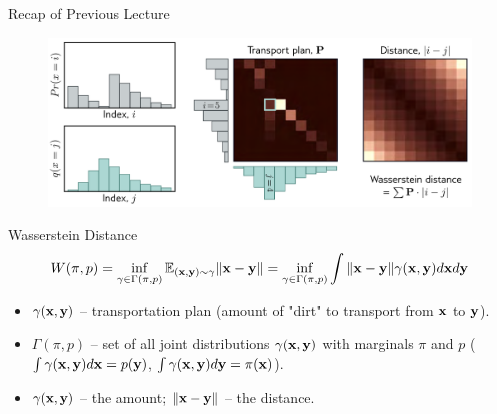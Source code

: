\documentclass{beamer}
\begin{document}
\begin{frame}{Recap of Previous Lecture}
	\begin{figure}
		\centering
		\includegraphics[width=0.8\linewidth]{figs/discrete_wasserstein}
	\end{figure}
	\vspace{-0.3cm}
	\begin{block}{Wasserstein Distance}
		\vspace{-0.7cm}
		\[
		W(\pi, p) = \inf_{\gamma \in \Gamma(\pi, p)} \mathbb{E}_{(\mathbf{x}, \mathbf{y}) \sim \gamma} \| \mathbf{x} - \mathbf{y} \| =  \inf_{\gamma \in \Gamma(\pi, p)} \int \| \mathbf{x} - \mathbf{y} \| \gamma (\mathbf{x}, \mathbf{y}) d \mathbf{x} d \mathbf{y}
		\]
		\vspace{-0.5cm}
		\begin{itemize}
			\item $\gamma(\mathbf{x}, \mathbf{y})$ -- transportation plan (amount of "dirt" to transport from $\mathbf{x}$ to $\mathbf{y}$).
			\item $\Gamma(\pi, p)$ -- set of all joint distributions $\gamma (\mathbf{x}, \mathbf{y})$ with marginals $\pi$ and $p$ ($\int \gamma(\mathbf{x}, \mathbf{y}) d \mathbf{x} = p(\mathbf{y})$, $\int \gamma(\mathbf{x}, \mathbf{y}) d \mathbf{y} = \pi(\mathbf{x})$).
			\item $\gamma(\mathbf{x}, \mathbf{y})$ -- the amount; $\|\mathbf{x} - \mathbf{y} \|$ -- the distance.
		\end{itemize}
	\end{block}
\end{frame}
\end{document}
